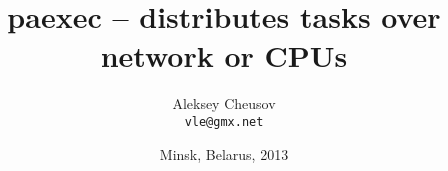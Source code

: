 \documentclass[hyperref={colorlinks=true}]{beamer}
\title{paexec -- distributes tasks over network or CPUs}
\author{Aleksey Cheusov \\ \texttt{vle@gmx.net}}
\date{Minsk, Belarus, 2013}
\begin{document}

\newenvironment{CodeSmall}[1]%
               {\Verbatim[label=\bf{#1},frame=single,%
                   fontsize=\footnotesize,%
                   commandchars=\\\{\}]}%
               {\endVerbatim}
\newenvironment{CodeSmallNoLabel}%
               {\Verbatim[frame=single,%
                   fontsize=\footnotesize,%
                   commandchars=\\\{\}]}%
               {\endVerbatim}

\newenvironment{Code}[1]%
              {\Verbatim[label=\bf{#1},frame=single,%
                  fontsize=\small,%
                  commandchars=\\\{\}]}%
              {\endVerbatim}
\newenvironment{CodeNoLabel}%
               {\Verbatim[frame=single,%
                   fontsize=\small,%
                   commandchars=\\\{\}]}%
               {\endVerbatim}

\newenvironment{CodeLarge}[1]%
               {\Verbatim[label=\bf{#1},frame=single,%
                   fontsize=\large,%
                   commandchars=\\\{\}]}%
               {\endVerbatim}
\newenvironment{CodeLargeNoLabel}%
               {\Verbatim[frame=single,%
                   fontsize=\large,%
                   commandchars=\\\{\}]}%
               {\endVerbatim}

\newcommand{\prompt}[1]{{\bf{#1}}}
\newcommand{\h}[1]{{\bf{#1}}}
\newcommand{\name}[1]{{\tt{#1}}}
\newcommand{\URL}[1]{\textbf{#1}}
\newcommand{\AutohellFile}[1]{\textcolor{red}{#1}}
\newcommand{\MKCfile}[1]{\textcolor{green}{#1}}
\newcommand{\ModuleName}[1]{\textbf{#1}\textnormal{}}
\newcommand{\ProgName}[1]{\textbf{#1}\textnormal{}}
\newcommand{\ProjectName}[1]{\textbf{#1}\textnormal{}}
\newcommand{\PackageName}[1]{\textbf{#1}\textnormal{}}
\newcommand{\MKC}[1]{\large\textsf{#1}\textnormal{}\normalsize}

\end{document}
